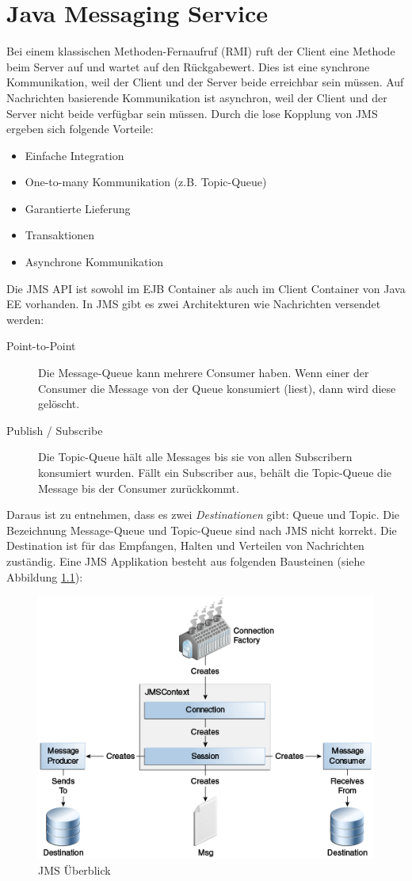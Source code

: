 \chapter{Java Messaging Service}

Bei einem klassischen Methoden-Fernaufruf (RMI) ruft der Client eine Methode beim Server auf und wartet auf den Rückgabewert. Dies ist eine synchrone Kommunikation, weil der Client und der Server beide erreichbar sein müssen. Auf Nachrichten basierende Kommunikation ist asynchron, weil der Client und der Server nicht beide verfügbar sein müssen. Durch die lose Kopplung von JMS ergeben sich folgende Vorteile:

\begin{itemize}
	\item Einfache Integration
	\item One-to-many Kommunikation (z.B. Topic-Queue)
	\item Garantierte Lieferung
	\item Transaktionen
	\item Asynchrone Kommunikation
\end{itemize}

Die JMS API ist sowohl im EJB Container als auch im Client Container von Java EE vorhanden. In JMS gibt es zwei Architekturen wie Nachrichten versendet werden:

\begin{description}
	\item[Point-to-Point] Die Message-Queue kann mehrere Consumer haben. Wenn einer der Consumer die Message von der Queue konsumiert (liest), dann wird diese gelöscht.
	\item[Publish / Subscribe] Die Topic-Queue hält alle Messages bis sie von allen Subscribern konsumiert wurden. Fällt ein Subscriber aus, behält die Topic-Queue die Message bis der Consumer zurückkommt.
\end{description}

Daraus ist zu entnehmen, dass es zwei \emph{Destinationen} gibt: Queue und Topic. Die Bezeichnung Message-Queue und Topic-Queue sind nach JMS nicht korrekt. Die Destination ist für das Empfangen, Halten und Verteilen von Nachrichten zuständig. Eine JMS Applikation besteht aus folgenden Bausteinen (siehe Abbildung \ref{fig:jms-overview}):

\begin{figure}
\centering
\includegraphics[width=0.7\linewidth]{fig/jms-overview}
\caption{JMS Überblick}
\label{fig:jms-overview}
\end{figure}

